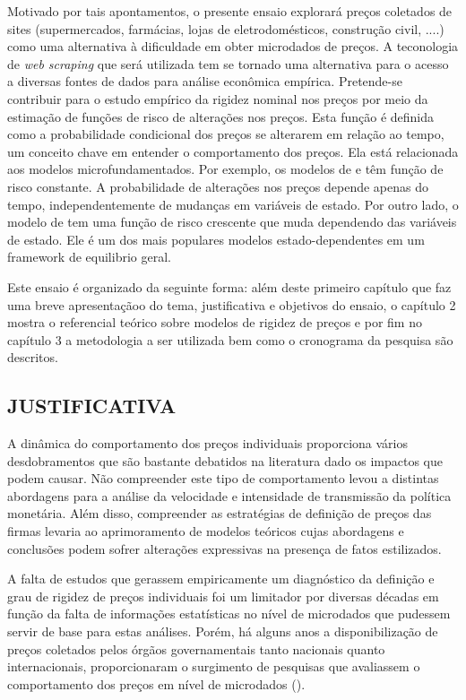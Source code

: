 \documentclass[twoside,a4paper,11pt]{report}
\begin{document}
Motivado por tais apontamentos, o presente ensaio explorará preços coletados de sites (supermercados, farmácias, lojas de eletrodomésticos, construção civil, ....) como uma alternativa à dificuldade em obter microdados de preços. A teconologia de \emph{web scraping} que será utilizada tem se tornado uma alternativa para o acesso a diversas fontes de dados para análise econômica empírica. Pretende-se contribuir para o estudo empírico da rigidez nominal nos preços por meio da estimação de funções de risco de alterações nos preços. Esta função é definida como a probabilidade condicional dos preços se alterarem em relação ao tempo, um conceito chave em entender o comportamento dos preços. Ela está relacionada aos modelos microfundamentados. Por exemplo, os modelos de \citet{calvo1983staggered} e \citet{taylor1980aggregate} têm função de risco constante. A probabilidade de alterações nos preços depende apenas do tempo, independentemente de mudanças em variáveis de estado. Por outro lado, o modelo de \citet{dotsey1999state} tem uma função de risco crescente que muda dependendo das variáveis de estado. Ele é um dos mais populares modelos estado-dependentes em um framework de equilibrio geral. 

Este ensaio é organizado da seguinte forma: além deste primeiro capítulo que faz uma breve apresentaçãoo do tema, justificativa e objetivos do ensaio, o capítulo 2 mostra o referencial teórico sobre modelos de rigidez de preços e por fim no capítulo 3 a metodologia a ser utilizada bem como o cronograma da pesquisa são descritos.

\subsection*{JUSTIFICATIVA}

A dinâmica do comportamento dos preços individuais proporciona vários desdobramentos que são bastante debatidos na literatura dado os impactos que podem causar. Não compreender este tipo de comportamento levou a distintas abordagens para a análise da velocidade e intensidade de transmissão da política monetária. Além disso, compreender as estratégias de definição de preços das firmas levaria ao aprimoramento de modelos teóricos cujas abordagens e conclusões podem sofrer alterações expressivas na presença de fatos estilizados. 

A falta de estudos que gerassem empiricamente um diagnóstico da definição e grau de rigidez de preços individuais foi um limitador por diversas décadas em função da falta de informações estatísticas no nível de microdados que pudessem servir de base para estas análises. Porém, há alguns anos a disponibilização de preços coletados pelos órgãos governamentais tanto nacionais quanto internacionais, proporcionaram o surgimento de pesquisas que avaliassem o comportamento dos preços em nível de microdados (\citet{bils2004some,nakamura2008five,klenow2008state,dhyne2006price,gouvea2007nominal,matos2009comportamento,lopes2008rigidez,bunn2012examining}). 
\end{document}
